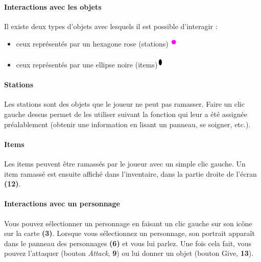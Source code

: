 \documentclass[./standalone.tex]{subfiles}
\begin{document}
\paragraph{Interactions avec les objets\\}
    Il existe deux types d’objets avec lesquels il est possible d’interagir :
    \begin{itemize}
    	\item ceux représentés par un hexagone rose (stations) \includegraphics[scale=1]{images/hexagone.png}
    	\item ceux représentés par une ellipse noire (items)\includegraphics[scale=1]{images/ellipse.png}
    \end{itemize}
            
\paragraph{Stations\\}
    Les stations sont des objets que le joueur ne peut pas ramasser. Faire un clic gauche dessus permet de les utiliser suivant la fonction qui leur a été assignée préalablement (obtenir une information en lisant un panneau, se soigner, etc.).
            
\paragraph{Items\\}
	Les items peuvent être ramassés par le joueur avec un simple clic gauche. Un item ramassé est ensuite affiché dans l’inventaire, dans la partie droite de l’écran \textbf{(12)}.
        
\paragraph{Interactions avec un personnage\\}
Vous pouvez sélectionner un personnage en faisant un clic gauche sur son icône sur la carte \textbf{(3)}. Lorsque vous sélectionnez un personnage, son portrait apparaît dans le panneau des personnages \textbf{(6)} et vous lui parlez. Une fois cela fait, vous pouvez l’attaquer (bouton \textit{Attack}, \textbf{9}) ou lui donner un objet (bouton Give, \textbf{13}).
        
\end{document}
